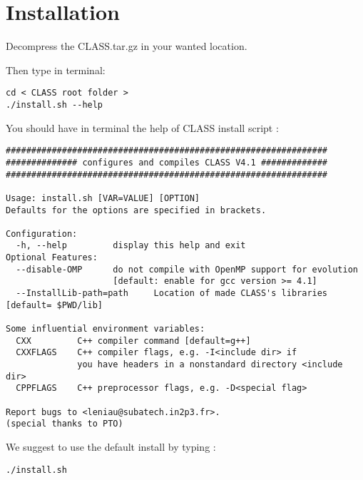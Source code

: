 \section{Installation}
Decompress the CLASS.tar.gz in your wanted location. 

 Then type in terminal:
\begin{center}
\begin{minipage}{\textwidth}
\begin{lstlisting}[style=terminal]
cd < CLASS root folder >
./install.sh --help
\end{lstlisting}
\end{minipage}
\end{center}

You should have in terminal the help of CLASS install script :
\begin{center}
\begin{minipage}{\textwidth}
\begin{lstlisting}[style=terminal]
###############################################################
############## configures and compiles CLASS V4.1 #############
###############################################################

Usage: install.sh [VAR=VALUE] [OPTION]
Defaults for the options are specified in brackets.

Configuration:
  -h, --help         display this help and exit
Optional Features:
  --disable-OMP      do not compile with OpenMP support for evolution 
                     [default: enable for gcc version >= 4.1]
  --InstallLib-path=path     Location of made CLASS's libraries [default= $PWD/lib]

Some influential environment variables:
  CXX         C++ compiler command [default=g++]
  CXXFLAGS    C++ compiler flags, e.g. -I<include dir> if
              you have headers in a nonstandard directory <include dir>
  CPPFLAGS    C++ preprocessor flags, e.g. -D<special flag>

Report bugs to <leniau@subatech.in2p3.fr>.
(special thanks to PTO)
\end{lstlisting}
\end{minipage}
\end{center}
We suggest to use the default install by typing :
\begin{center}
\begin{minipage}{\textwidth}
\begin{lstlisting}[style=terminal]
./install.sh
\end{lstlisting}
\end{minipage}
\end{center}
